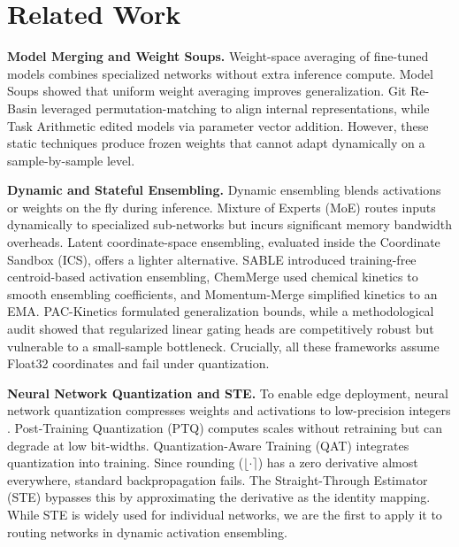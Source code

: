 \section{Related Work}
\label{sec:related}

\textbf{Model Merging and Weight Soups.} Weight-space averaging of fine-tuned models combines specialized networks without extra inference compute. Model Soups \cite{wortsman2022model} showed that uniform weight averaging improves generalization. Git Re-Basin \cite{ainsworth2022git} leveraged permutation-matching to align internal representations, while Task Arithmetic \cite{ilharco2022editing} edited models via parameter vector addition. However, these static techniques produce frozen weights that cannot adapt dynamically on a sample-by-sample level.

\textbf{Dynamic and Stateful Ensembling.} Dynamic ensembling blends activations or weights on the fly during inference. Mixture of Experts (MoE) \cite{shazeer2017outrageously, fedus2022switch} routes inputs dynamically to specialized sub-networks but incurs significant memory bandwidth overheads. Latent coordinate-space ensembling, evaluated inside the Coordinate Sandbox (ICS), offers a lighter alternative. SABLE \cite{sable2024stateless} introduced training-free centroid-based activation ensembling, ChemMerge \cite{chemmerge2025continuous} used chemical kinetics to smooth ensembling coefficients, and Momentum-Merge \cite{momentummerge2025exponential} simplified kinetics to an EMA. PAC-Kinetics \cite{packinetics2025learning} formulated generalization bounds, while a methodological audit \cite{audit2025deconstructing} showed that regularized linear gating heads are competitively robust but vulnerable to a small-sample bottleneck. Crucially, all these frameworks assume Float32 coordinates and fail under quantization.

\textbf{Neural Network Quantization and STE.} To enable edge deployment, neural network quantization compresses weights and activations to low-precision integers \cite{han2015deep, hubara2017quantized}. Post-Training Quantization (PTQ) \cite{nagel2019data, nagel2020up} computes scales without retraining but can degrade at low bit-widths. Quantization-Aware Training (QAT) \cite{jacob2018quantization, choi2018pact} integrates quantization into training. Since rounding ($\lfloor \cdot \rceil$) has a zero derivative almost everywhere, standard backpropagation fails. The Straight-Through Estimator (STE) \cite{bengio2013estimating, courbariaux2015binaryconnect, yin2019understanding} bypasses this by approximating the derivative as the identity mapping. While STE is widely used for individual networks, we are the first to apply it to routing networks in dynamic activation ensembling.

